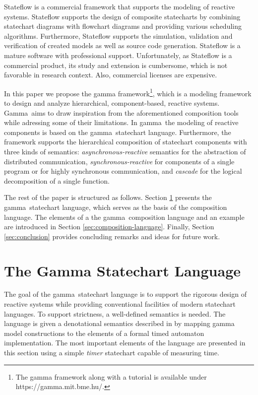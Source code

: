 \documentclass[conference]{IEEEtran}
\newcommand{\framework}[0]{\textsf{gamma framework}}
\renewcommand{\gamma}[0]{\textsf{gamma}}
\renewcommand{\Gamma}[0]{\textsf{Gamma}}
\begin{document}
Stateflow \cite{stateflow} is a commercial framework that supports the modeling of
reactive systems. Stateflow supports the design of composite
statecharts by combining
statechart diagrams with flowchart diagrams and providing various scheduling
algorithms. Furthermore, Stateflow supports the simulation, validation and verification of created models as well as source code generation. Stateflow is a mature software with professional
support. Unfortunately, as Stateflow is a commercial product, its study and extension is cumbersome, which is not favorable in research context. Also, commercial licenses are expensive.

In this paper we propose the \framework\footnote{The gamma framework along with a tutorial is available under https://gamma.mit.bme.hu/.}, which is a modeling framework to design and analyze hierarchical, component-based, reactive systems. \Gamma\ aims to draw inspiration from the aforementioned composition tools while adressing some of their limitations. In \gamma\ the modeling of reactive components is based on the \gamma\ statechart language. Furthermore, the framework supports the hierarchical composition of statechart components with three kinds of semantics:
\emph{asynchronous-reactive} semantics for the abstraction of distributed communication,
\emph{synchronous-reactive} for components of a single program or for highly synchronous
communication, and \emph{cascade} for the logical decomposition of a single function.

The rest of the paper is structured as follows. Section \ref{sec:statechart-language} presents the \gamma\ statechart language, which serves as the basis of the composition language. The elements of a the \gamma\ composition language and an example are introduced in Section \ref{sec:composition-language}. Finally, Section \ref{sec:conclusion} provides concluding remarks and ideas for future work.

\section{The Gamma Statechart Language}
\label{sec:statechart-language}
The goal of the \gamma\ statechart language is to support the rigorous design of reactive
systems while providing conventional facilities of modern statechart languages. To support
strictness, a well-defined semantics is needed. The language is given a denotational semantics
described in \cite{graics-bence-bsc} by mapping gamma model constructions to the elements of a formal timed
automaton implementation. The most important elements of the language are presented in this section using a simple \emph{timer} statechart capable of measuring time.
\end{document}
